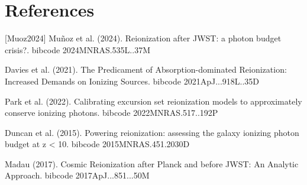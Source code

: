 \documentclass[twocolumn]{aastex631}
\begin{document}
\section*{References}
\footnotesize
[Muoz2024] Muñoz et al. (2024). Reionization after JWST: a photon budget crisis?. bibcode 2024MNRAS.535L..37M \par [Davies2021] Davies et al. (2021). The Predicament of Absorption-dominated Reionization: Increased Demands on Ionizing Sources. bibcode 2021ApJ...918L..35D \par [Park2022] Park et al. (2022). Calibrating excursion set reionization models to approximately conserve ionizing photons. bibcode 2022MNRAS.517..192P \par [Duncan2015] Duncan et al. (2015). Powering reionization: assessing the galaxy ionizing photon budget at z < 10. bibcode 2015MNRAS.451.2030D \par [Madau2017] Madau (2017). Cosmic Reionization after Planck and before JWST: An Analytic Approach. bibcode 2017ApJ...851...50M
\end{document}
